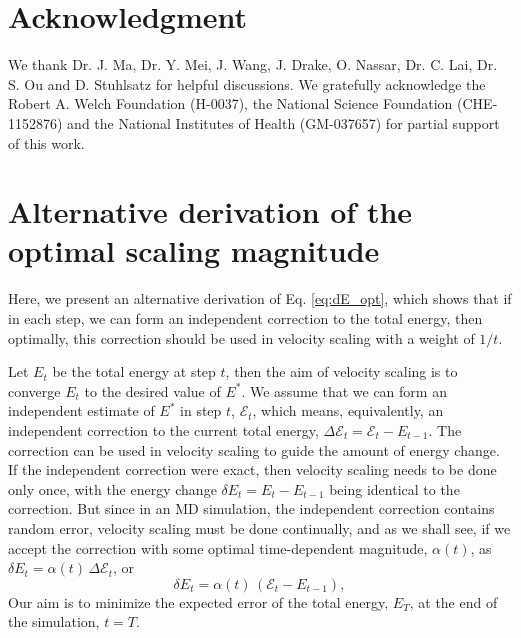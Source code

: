 \documentclass[preprint]{revtex4-1}
\begin{document}
\section{Acknowledgment}

We thank Dr. J. Ma, Dr. Y. Mei, J. Wang,
J. Drake, O. Nassar, Dr. C. Lai, Dr. S. Ou and D. Stuhlsatz
for helpful discussions.
We gratefully acknowledge the Robert A. Welch Foundation (H-0037),
the National Science Foundation (CHE-1152876)
and
the National Institutes of Health (GM-037657) for partial support of this work.
%


\appendix


\section{\label{sec:error}
  Alternative derivation of
  the optimal scaling magnitude
}


Here, we present an alternative derivation of Eq. \eqref{eq:dE_opt},
which shows that if in each step, we can form an independent correction
to the total energy,
then optimally,
this correction should be used
in velocity scaling with a weight of $1/t$.

Let $E_t$ be the total energy at step $t$,
then the aim of velocity scaling is to converge $E_t$
to the desired value of $E^*$.
%
We assume that we can form an independent estimate of $E^*$
in step $t$, $\mathcal E_t$,
which means, equivalently, an independent correction
to the current total energy,
$\Delta \mathcal E_t = \mathcal E_t - E_{t-1}$.
%
The correction can be used in velocity scaling
to guide the amount of energy change.
%
If the independent correction were exact,
then velocity scaling needs to be done only once,
with the energy change $\delta E_t = E_t - E_{t-1}$
being identical to the correction.
%
But since in an MD simulation,
the independent correction contains random error,
velocity scaling must be done continually,
and as we shall see,
if we accept the correction with some
optimal time-dependent magnitude, $\alpha(t)$,
as
$\delta E_t = \alpha(t) \, \Delta \mathcal E_t$,
or
%
\begin{equation}
  \delta E_t = \alpha(t) \, \left( \mathcal E_t - E_{t - 1} \right)
  ,
  \label{eq:Eupdate}
\end{equation}
%
Our aim is to minimize
the expected error of the total energy, $E_T$,
at the end of the simulation, $t = T$.
\end{document}
